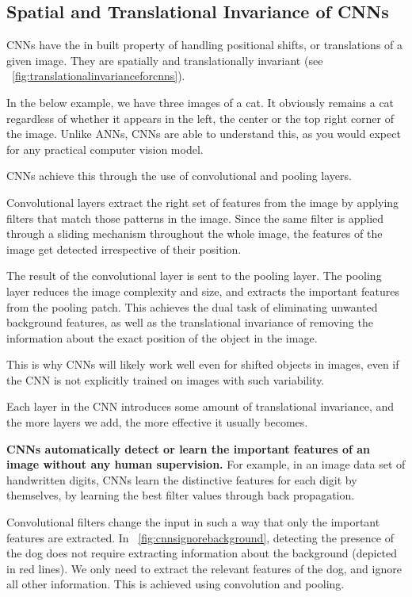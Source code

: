 	\subsection{Spatial and Translational Invariance of CNNs}

	\begin{bulletedlist}
		\item CNNs have the in built property of handling positional shifts, or translations of a given image. They are
spatially and translationally invariant (see \figurename~\ref{fig:translationalinvarianceforcnns}).
		\item In the below example, we have three images of a cat.  It obviously remains a cat regardless of whether it appears in the left, the center or the top right corner of the image.  Unlike ANNs, CNNs are able to understand this, as you would expect for any practical computer vision model.
		\item CNNs achieve this through the use of convolutional and pooling layers.
		\item Convolutional layers extract the right set of features from the image by applying filters that match those patterns in the image. Since the same filter is applied through a sliding mechanism throughout the whole image, the features of the image get detected irrespective of their position.
		\item The result of the convolutional layer is sent to the pooling layer. The pooling layer reduces the image complexity and size, and extracts the important features from the pooling patch. This achieves the dual task of eliminating unwanted background features, as well as the translational invariance of removing the information about the exact position of the object in the image.
		\item This is why CNNs will likely work well even for shifted objects in images, even if the CNN is not explicitly trained on images with such variability.
		\item Each layer in the CNN introduces some amount of translational invariance, and the more layers we add, the more effective it usually becomes.
		\item \textbf{CNNs automatically detect or learn the important features of an image without any human supervision.} For example, in an image data set of handwritten digits, CNNs learn the distinctive features for each digit by themselves, by learning the best filter values through back propagation.
		\item Convolutional filters change the input in such a way that only the important features are extracted.  In \figurename~\ref{fig:cnnsignorebackground}, detecting the presence of the dog does not require extracting information about the background (depicted in red lines).  We only need to extract the relevant features of the dog, and ignore all other information.  This is achieved using convolution and pooling.
	\end{bulletedlist}

